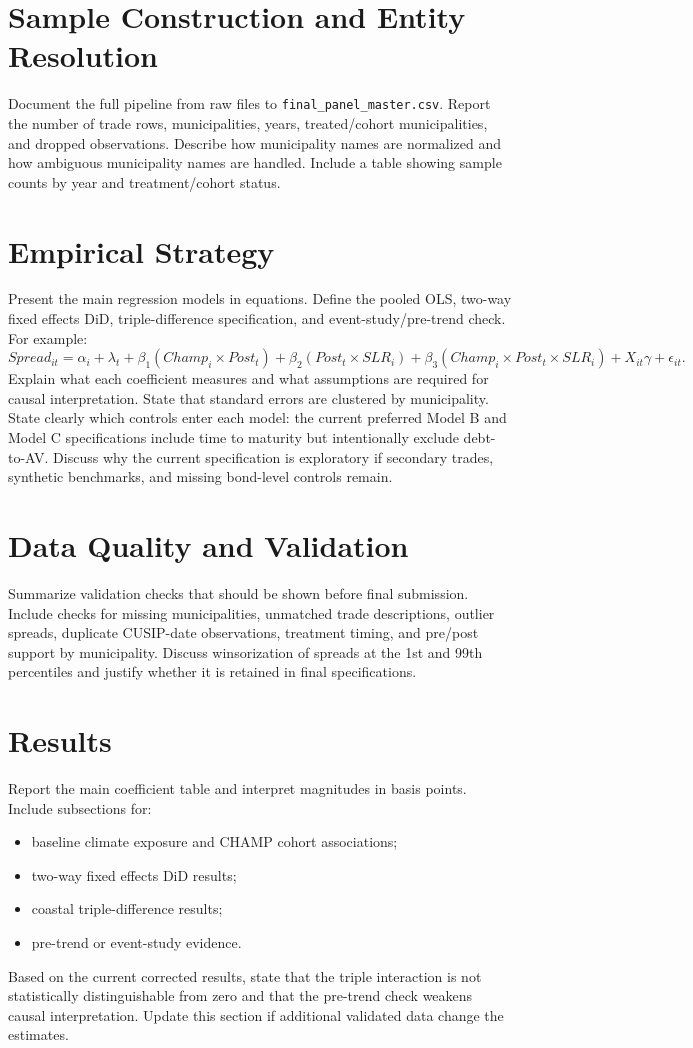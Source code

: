 \documentclass[12pt]{article}
\begin{document}
\section{Sample Construction and Entity Resolution}
Document the full pipeline from raw files to \texttt{final\_panel\_master.csv}.
Report the number of trade rows, municipalities, years, treated/cohort municipalities, and dropped observations.
Describe how municipality names are normalized and how ambiguous municipality names are handled.
Include a table showing sample counts by year and treatment/cohort status.

\section{Empirical Strategy}
Present the main regression models in equations.
Define the pooled OLS, two-way fixed effects DiD, triple-difference specification, and event-study/pre-trend check.
For example:
\[
Spread_{i t} = \alpha_i + \lambda_t + \beta_1(Champ_i \times Post_t)
 + \beta_2(Post_t \times SLR_i)
 + \beta_3(Champ_i \times Post_t \times SLR_i)
 + X_{it}\gamma + \epsilon_{it}.
\]
Explain what each coefficient measures and what assumptions are required for causal interpretation.
State that standard errors are clustered by municipality.
State clearly which controls enter each model: the current preferred Model B and Model C specifications include time to maturity but intentionally exclude debt-to-AV.
Discuss why the current specification is exploratory if secondary trades, synthetic benchmarks, and missing bond-level controls remain.

\section{Data Quality and Validation}
Summarize validation checks that should be shown before final submission.
Include checks for missing municipalities, unmatched trade descriptions, outlier spreads, duplicate CUSIP-date observations, treatment timing, and pre/post support by municipality.
Discuss winsorization of spreads at the 1st and 99th percentiles and justify whether it is retained in final specifications.

\section{Results}
Report the main coefficient table and interpret magnitudes in basis points.
Include subsections for:
\begin{itemize}[leftmargin=*]
    \item baseline climate exposure and CHAMP cohort associations;
    \item two-way fixed effects DiD results;
    \item coastal triple-difference results;
    \item pre-trend or event-study evidence.
\end{itemize}
Based on the current corrected results, state that the triple interaction is not statistically distinguishable from zero and that the pre-trend check weakens causal interpretation.
Update this section if additional validated data change the estimates.
\end{document}

